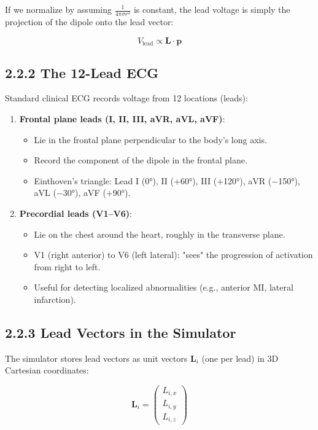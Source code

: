 \documentclass[12pt,oneside,a4paper]{book}
\begin{document}
If we normalize by assuming $\frac{1}{4\pi\sigma r^2}$ is constant, the lead voltage is simply the projection of the dipole onto the lead vector:

$$V_{\text{lead}} \propto \mathbf{L} \cdot \mathbf{p}$$

\subsection{2.2.2 The 12-Lead ECG}

Standard clinical ECG records voltage from 12 locations (leads):

\begin{enumerate}
  \item \textbf{Frontal plane leads (I, II, III, aVR, aVL, aVF)}:
    \begin{itemize}
      \item Lie in the frontal plane perpendicular to the body's long axis.
      \item Record the component of the dipole in the frontal plane.
      \item Einthoven's triangle: Lead I (0°), II (+60°), III (+120°), aVR (−150°), aVL (−30°), aVF (+90°).
    \end{itemize}

  \item \textbf{Precordial leads (V1--V6)}:
    \begin{itemize}
      \item Lie on the chest around the heart, roughly in the transverse plane.
      \item V1 (right anterior) to V6 (left lateral): "sees" the progression of activation from right to left.
      \item Useful for detecting localized abnormalities (e.g., anterior MI, lateral infarction).
    \end{itemize}
\end{enumerate}

\subsection{2.2.3 Lead Vectors in the Simulator}

The simulator stores lead vectors as unit vectors $\mathbf{L}_i$ (one per lead) in 3D Cartesian coordinates:

$$\mathbf{L}_i = \begin{pmatrix} L_{i,x} \\ L_{i,y} \\ L_{i,z} \end{pmatrix}$$
\end{document}
